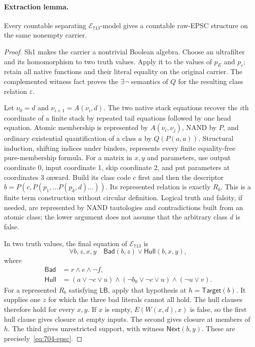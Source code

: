\paragraph{Extraction lemma.}
Every countable separating $\mathcal E_{713}$-model gives a countable
raw-EPSC structure on the same nonempty carrier.

\begin{proof}
Sh1 makes the carrier a nontrivial Boolean algebra.  Choose an
ultrafilter and its homomorphism to two truth values.  Apply it to
the values of $p_E$ and $p_\varepsilon$; retain all native functions
and their literal equality on the original carrier.  The complemented
witness fact proves the $\exists\neg$ semantics of $Q$ for the resulting
class relation $\varepsilon$.

Let $\nu_0=d$ and $\nu_{i+1}=A(\nu_i,d)$.  The two native stack
equations recover the $i$th coordinate of a finite stack by repeated
tail equations followed by one head equation.  Atomic membership
is represented by $A(\nu_i,\nu_j)$, NAND by $P$, and ordinary
existential quantification of a class $a$ by $Q(P(a,a))$.
Structural induction, shifting indices under binders, represents every
finite equality-free pure-membership formula.  For a matrix in $x,y$
and parameters, use output coordinate 0, input coordinate 1, skip
coordinate 2, and put parameters at coordinates 3 onward.  Build its
class code $c$ first and then the descriptor
$b=P(c,P(p_1,\ldots P(p_k,d)\ldots))$.  Its represented relation
is exactly $R_b$.  This is a finite term construction without circular
definition.  Logical truth and falsity, if needed, are represented by
NAND tautologies and contradictions built from an atomic class; the
lower argument does not assume that the arbitrary class $d$ is false.

In two truth values, the final equation of $\mathcal E_{713}$ is
\[
 \forall b,z,x,y\quad
 \mathsf{Bad}(b,z)\lor\mathsf{Hull}(b,x,y),
\]
where
\begin{align*}
 \mathsf{Bad}&=r\land e\land\neg f,\\
 \mathsf{Hull}&=(a\lor\neg c\lor u)
            \land(\neg b_0\lor\neg c\lor u)
            \land(\neg u\lor v).
\end{align*}
For a represented $R_b$ satisfying $\mathsf{LB}$, apply that hypothesis
at $h=\mathsf{Target}(b)$.  It supplies one $z$ for which the three
bad literals cannot all hold.  The hull clauses therefore hold for
every $x,y$.  If $x$ is empty, $E(W(x,d),x)$ is false, so the first
hull clause gives closure at empty inputs.  The second gives closure
at members of $h$.  The third gives unrestricted support, with witness
$\mathsf{Next}(b,y)$.  These are precisely~\eqref{eq:704-epsc}.
\end{proof}

